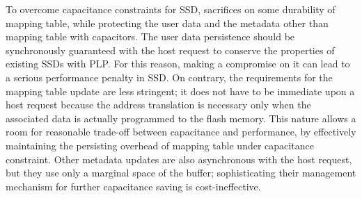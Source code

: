 To overcome capacitance constraints for SSD, \ours{} sacrifices on some durability of mapping table, 
while protecting the user data and the metadata other than mapping table with capacitors. 
The user data persistence should be synchronously guaranteed with the host request
to conserve the properties of existing SSDs with PLP. 
For this reason, making a compromise on it can lead to a serious performance penalty in SSD.
On contrary, the requirements for the mapping table update are less stringent;
it does not have to be immediate upon a host request because the address translation is 
necessary only when the associated data is actually programmed to the flash memory. 
This nature allows a room for reasonable trade-off between capacitance and performance,
by effectively maintaining the persisting overhead of mapping table under capacitance constraint. 
Other metadata updates are also asynchronous with the host request, but
they use only a marginal space of the buffer; sophisticating their management mechanism 
for further capacitance saving is cost-ineffective. 

